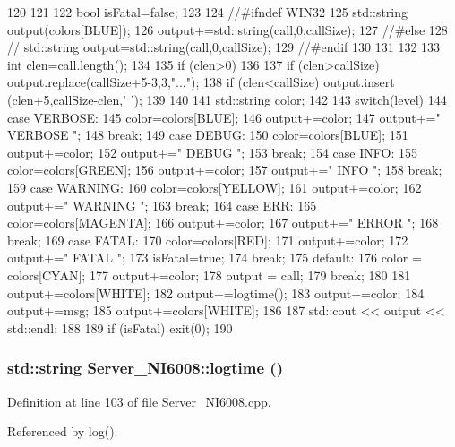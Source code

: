 \begin{DoxyCode}
120                                   {
121 
122   bool isFatal=false;   
123   
124   //#ifndef WIN32
125   std::string output(colors[BLUE]);
126   output+=std::string(call,0,callSize);
127   //#else
128   //  std::string output=std::string(call,0,callSize);
129   //#endif
130 
131 
132 
133   int clen=call.length();
134 
135   if (clen>0)
136   {
137     if (clen>callSize) output.replace(callSize+5-3,3,"...");
138     if (clen<callSize) output.insert (clen+5,callSize-clen,' ');
139   }
140   
141   std::string color;
142   
143   switch(level) {       
144   case VERBOSE:
145     color=colors[BLUE];
146     output+=color;
147     output+=" VERBOSE ";
148     break;
149   case DEBUG:
150     color=colors[BLUE];
151     output+=color;
152     output+=" DEBUG   ";
153     break;
154   case INFO:
155     color=colors[GREEN];
156     output+=color;
157     output+=" INFO    ";
158     break;
159   case WARNING:
160     color=colors[YELLOW];    
161     output+=color;
162     output+=" WARNING ";
163     break;
164   case ERR:
165     color=colors[MAGENTA];    
166     output+=color;
167     output+=" ERROR   ";
168     break;
169   case FATAL:
170     color=colors[RED];
171     output+=color;
172     output+=" FATAL   ";
173     isFatal=true;
174     break;
175   default:
176     color  = colors[CYAN];
177     output+=color;
178     output = call;
179     break;
180   }
181   output+=colors[WHITE];
182   output+=logtime();
183   output+=color;
184   output+=msg;
185   output+=colors[WHITE];
186   
187   std::cout << output << std::endl;
188 
189   if (isFatal) {exit(0);}
190 }
\end{DoxyCode}
\hypertarget{classServer__NI6008_aab6f8e71661f6234a72d539dedbd53d2}{
\subsubsection[{logtime}]{\setlength{\rightskip}{0pt plus 5cm}std::string Server\_\-NI6008::logtime ()}}
\label{classServer__NI6008_aab6f8e71661f6234a72d539dedbd53d2}


Definition at line 103 of file Server\_\-NI6008.cpp.

Referenced by log().


